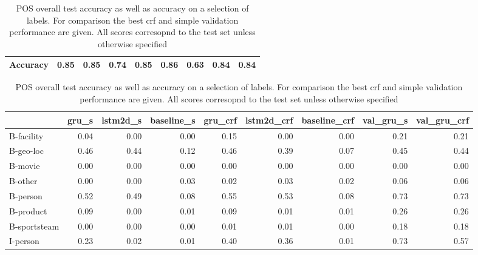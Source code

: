 \documentclass[11pt,a4paper]{article}
\begin{document}
\begin{table}[h]
\begin{tabular}{lrrrrrrrr}
Accuracy &              0.85 &                 0.85 &                   0.74 &            0.85 &               0.86 &                 0.63 &             0.84 &           0.84 \\
\bottomrule
\end{tabular} 
\caption{POS overall test accuracy as well as accuracy on a selection of labels. For comparison the best crf and simple validation performance are given. All scores corresopnd to the test set 
unless otherwise specified}

\vspace{12pt}
\begin{tabular}{lrrrrrrrr}
\toprule
{} &  gru\_s &  lstm2d\_s &  baseline\_s &  gru\_crf &  lstm2d\_crf &  baseline\_crf &  val\_gru\_s &  val\_gru\_crf \\
\midrule
B-facility   &            0.04 &               0.00 &                 0.00 &              0.15 &                 0.00 &                   0.00 &           0.21 &             0.21 \\
B-geo-loc    &            0.46 &               0.44 &                 0.12 &              0.46 &                 0.39 &                   0.07 &           0.45 &             0.44 \\
B-movie      &            0.00 &               0.00 &                 0.00 &              0.00 &                 0.00 &                   0.00 &           0.00 &             0.00 \\
B-other      &            0.00 &               0.00 &                 0.03 &              0.02 &                 0.03 &                   0.02 &           0.06 &             0.06 \\
B-person     &            0.52 &               0.49 &                 0.08 &              0.55 &                 0.53 &                   0.08 &           0.73 &             0.73 \\
B-product    &            0.09 &               0.00 &                 0.01 &              0.09 &                 0.01 &                   0.01 &           0.26 &             0.26 \\
B-sportsteam &            0.00 &               0.00 &                 0.00 &              0.01 &                 0.01 &                   0.00 &           0.18 &             0.18 \\
I-person     &            0.23 &               0.02 &                 0.01 &              0.40 &                 0.36 &                   0.01 &           0.73 &             0.57 \\

\end{tabular}
\end{table}
\end{document}
